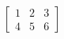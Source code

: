 \documentclass{article} %
\begin{document}
\listoffigures %
\listoftables

$\begin{bmatrix}
  1 & 2 & 3\\
  4 & 5 & 6
\end{bmatrix}$
\end{document}
